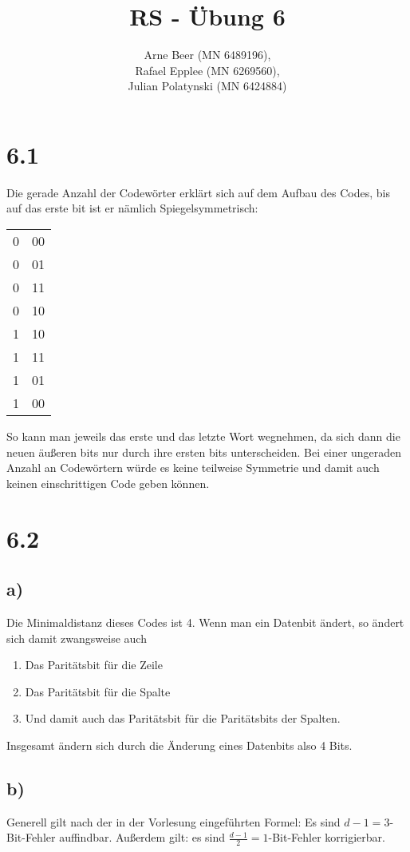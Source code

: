\documentclass{article}
\title{RS - Übung 6}
\author{Arne Beer (MN 6489196), \\
	Rafael Epplee (MN 6269560), \\
	Julian Polatynski (MN 6424884)}
\begin{document}
\maketitle

\section*{6.1}
	Die gerade Anzahl der Codewörter erklärt sich auf dem Aufbau des Codes, bis auf das erste bit ist er nämlich Spiegelsymmetrisch:

	\begin{tabular}{r|l}
		0 & 00 \\
		0 & 01 \\
		0 & 11 \\
		0 & 10 \\ \hline
		1 & 10 \\
		1 & 11 \\
		1 & 01 \\
		1 & 00
	\end{tabular}

	So kann man jeweils das erste und das letzte Wort wegnehmen, da sich dann die neuen äußeren bits nur durch ihre ersten bits unterscheiden.
	Bei einer ungeraden Anzahl an Codewörtern würde es keine teilweise Symmetrie und damit auch keinen einschrittigen Code geben können.

\section*{6.2}
	\subsection*{a)}
		Die Minimaldistanz dieses Codes ist 4. Wenn man ein Datenbit ändert, so ändert sich damit zwangsweise auch
		\begin {enumerate}
			\item Das Paritätsbit für die Zeile
			\item Das Paritätsbit für die Spalte
			\item Und damit auch das Paritätsbit für die Paritätsbits der Spalten.
		\end{enumerate}

		Insgesamt ändern sich durch die Änderung eines Datenbits also 4 Bits.

	\subsection*{b)}
		Generell gilt nach der in der Vorlesung eingeführten Formel: Es sind $d-1=3$-Bit-Fehler auffindbar. Außerdem gilt: es sind $\frac{d-1}{2}=1$-Bit-Fehler korrigierbar.
\end{document}
